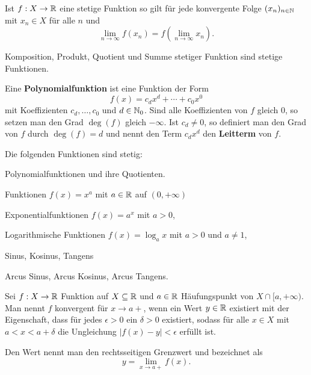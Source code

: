 \begin{thm}
	Ist $f : X \to \mathbb{R}$ eine stetige Funktion so gilt für jede konvergente Folge $(x_n)_{n \in \mathbb{N}}$ mit $x_n \in X$ für alle $n$ und
	\[
		\lim_{n \to \infty} f(x_n) = f ( \lim_{n \to \infty} x_n). 
	\]
\end{thm} 

\begin{thm}
	Komposition, Produkt, Quotient und Summe stetiger Funktion sind stetige Funktionen. 
\end{thm} 

\begin{defn} 
	Eine \textbf{Polynomialfunktion} ist eine Funktion der Form 
	\[
	f(x) = c_d x^d + \cdots + c_0 x^0
	\] 
	mit Koeffizienten $c_d,\ldots,c_0$ und $d \in \mathbb{N}_0$. Sind alle Koeffizienten von $f$ gleich $0$, so setzen man den Grad $\deg(f)$ gleich $-\infty$. Ist $c_d \ne 0$, so definiert man den Grad von $f$ durch $\deg(f) = d$ und nennt den Term $c_d x^d$ den \textbf{Leitterm} von $f$. 
\end{defn} 


\begin{thm} Die folgenden Funktionen sind stetig: 
	\begin{enuma}
		\item Polynomialfunktionen und ihre Quotienten. 
		\item Funktionen $f(x) = x^a$ mit $a \in \mathbb{R}$ auf $(0,+\infty)$
		\item Exponentialfunktionen $f(x) = a^x$ mit $a > 0$,  
		\item Logarithmische Funktionen $f(x) = \log_a x$ mit $a > 0$ und $a \ne 1$, 
		\item Sinus, Kosinus, Tangens
		\item Arcus Sinus, Arcus Kosinus, Arcus Tangens.
	\end{enuma} 
\end{thm} 

\begin{defn} 
	Sei $f : X \to \mathbb{R}$ Funktion auf $X \subseteq \mathbb{R}$ und $a \in \mathbb{R}$ Häufungspunkt von $X \cap [a,+\infty)$. Man  nennt $f$ konvergent für $x \to a+$, wenn ein Wert $y \in \mathbb{R}$ existiert mit der Eigenschaft, dass für jedes $\epsilon>0$ ein $\delta>0$ existiert, sodass für alle $x \in X$ mit $a < x < a + \delta$ die Ungleichung $|f(x) - y| < \epsilon$ erfüllt ist. 
	
	
	Den Wert nennt man den rechtsseitigen Grenzwert und bezeichnet als
	\[
	y = \lim_{x \to a+} f(x).
	\]
\end{defn}


